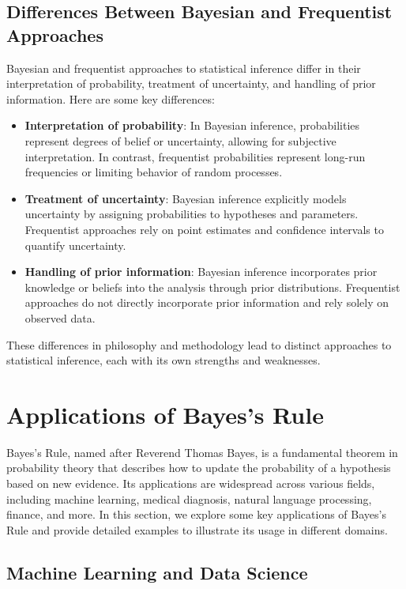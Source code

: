 \documentclass[12pt]{book} %
\begin{document}
\subsection{Differences Between Bayesian and Frequentist Approaches}

Bayesian and frequentist approaches to statistical inference differ in their interpretation of probability, treatment of uncertainty, and handling of prior information. Here are some key differences:

\begin{itemize}
    \item \textbf{Interpretation of probability}: In Bayesian inference, probabilities represent degrees of belief or uncertainty, allowing for subjective interpretation. In contrast, frequentist probabilities represent long-run frequencies or limiting behavior of random processes.
    \item \textbf{Treatment of uncertainty}: Bayesian inference explicitly models uncertainty by assigning probabilities to hypotheses and parameters. Frequentist approaches rely on point estimates and confidence intervals to quantify uncertainty.
    \item \textbf{Handling of prior information}: Bayesian inference incorporates prior knowledge or beliefs into the analysis through prior distributions. Frequentist approaches do not directly incorporate prior information and rely solely on observed data.
\end{itemize}

These differences in philosophy and methodology lead to distinct approaches to statistical inference, each with its own strengths and weaknesses.


\section{Applications of Bayes's Rule}

Bayes's Rule, named after Reverend Thomas Bayes, is a fundamental theorem in probability theory that describes how to update the probability of a hypothesis based on new evidence. Its applications are widespread across various fields, including machine learning, medical diagnosis, natural language processing, finance, and more. In this section, we explore some key applications of Bayes's Rule and provide detailed examples to illustrate its usage in different domains.

\subsection{Machine Learning and Data Science}
\end{document}
